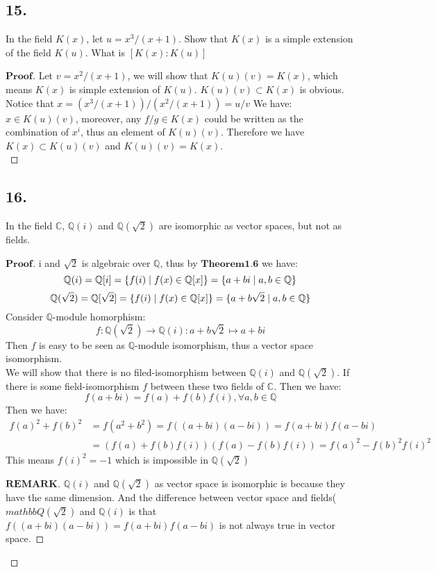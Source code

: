 \documentclass[a4paper, 11pt]{article}
\newenvironment{myprf}
{\renewcommand\qedsymbol{$ $}\begin{proof}[$\textbf{Proof}$]}
  {\end{proof}}
\newenvironment{myremark}
{\renewcommand\qedsymbol{$ $}\begin{proof}[$\textbf{REMARK}$]}
  {\end{proof}}
\begin{document}
 \subsection*{15.}
 In the field $K(x)$, let $u=x^3/(x+1)$. Show that $K(x)$ is a simple extension of the field $K(u)$. What is
 $[K(x):K(u)]$
 \begin{myprf}
         Let $v=x^2/(x+1)$, we will show that $K(u)(v)=K(x)$, which means $K(x)$ is simple extension of $K(u)$.
         $K(u)(v)\subset K(x)$ is obvious. Notice that $x=(x^3/(x+1))/(x^2/(x+1))=u/v$ We have:$x\in K(u)(v)$,
         moreover, any $f/g\in K(x)$ could be written as the combination of $x^i$, thus an element of $K(u)(v)$.
         Therefore we have $K(x)\subset K(u)(v)$ and $K(u)(v)=K(x)$.\\
 \end{myprf}

 \subsection*{16.}
 In the field $\mathbb{C}$, $\mathbb{Q}(i)$ and $\mathbb{Q}(\sqrt{2})$ are isomorphic as vector spaces, but not
 as fields.
 \begin{myprf}
         i and $\sqrt{2}$ is algebraic over $\mathbb{Q}$, thus by $\textbf{Theorem1.6}$ we have:
         $$
         \mathbb{Q}(i)=
         \mathbb{Q}[i]=\{f(i)\mid f(x)\in \mathbb{Q}[x]\}=\{a+bi\mid a,b\in \mathbb{Q}\} \\
         $$
         $$
         \mathbb{Q}(\sqrt{2})=
         \mathbb{Q}[\sqrt{2}]=\{f(i)\mid f(x)\in \mathbb{Q}[x]\}=\{a+b\sqrt{2}\mid a,b\in \mathbb{Q}\}\\
         $$ 
         Consider $\mathbb{Q}$-module homorphism:
         $$
         f:
         \mathbb{Q}(\sqrt{2})\rightarrow \mathbb{Q}(i):a+b\sqrt{2}
         \mapsto a+bi
         $$ Then $f$ is easy to be seen as $\mathbb{Q}$-module isomorphism, thus a vector space isomorphism.\\
         We will show that there is no filed-isomorphism between $\mathbb{Q}(i)$ and $\mathbb{Q}(\sqrt{2})$.
         If there is some field-isomorphism $f$ between these two fields of $\mathbb{C}$. Then we have:
         $$
         f(a+bi)=f(a)+f(b)f(i), \forall a,b\in \mathbb{Q}
         $$ Then we have:
         $$
         \begin{aligned}
                 f(a)^2+f(b)^2&=f(a^2+b^2)=f((a+bi)(a-bi))=f(a+bi)f(a-bi)\\&=(f(a)+f(b)f(i))(f(a)-f(b)f(i))=f(a)^2-f(b)^2f(i)^2
         \end{aligned}
         $$ This means $f(i)^2=-1$ which is impossible in $\mathbb{Q}(\sqrt{2})$
         \begin{myremark}
                 $\mathbb{Q}(i)$ and $\mathbb{Q}(\sqrt{2})$ as vector space is isomorphic is because they have
                 the same dimension. And the difference between vector space and fields($mathbb{Q}(\sqrt{2})$ and 
                 $\mathbb{Q}(i)$ is that 
                 $f((a+bi)(a-bi))=f(a+bi)f(a-bi)$ is not always true in vector space.
         \end{myremark}

        
         
 \end{myprf}
\end{document}
